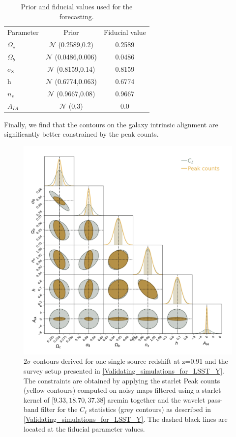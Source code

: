 \documentclass[twocolumn,twocolappendix]{aastex63}
\begin{document}
\begin{table}
	\centering
	\caption{ Prior and fiducial values used for the forecasting.}
	\begin{tabular}{lcc} 
		\hline \hline
		Parameter  & Prior & Fiducial value \\
		$\Omega_c$ & $\mathcal{N}$ (0.2589,0.2) & 0.2589 \\
		$\Omega_b$ & $\mathcal{N}$ (0.0486,0.006) & 0.0486 \\
		$\sigma_8$ & $\mathcal{N}$ (0.8159,0.14) & 0.8159 \\
		h & $\mathcal{N}$ (0.6774,0.063) & 0.6774\\
		$n_s$ & $\mathcal{N}$ (0.9667,0.08) & 0.9667 \\
		$A_{IA}$ &  $\mathcal{N}$ (0,3) &  0.0 \\
		\hline
	\end{tabular}
	\label{tab:prior}
\end{table}
Finally, we find that the contours on the galaxy intrinsic alignment are significantly better constrained by the peak counts. 



 
\begin{figure}
    \centering
    \includegraphics[width=\textwidth]{paper/figures/Fisher_n.pdf}
    \caption{$2\sigma$ contours derived for one single source redshift at z=0.91 and the survey setup presented in \autoref{Validating_simulations_for_LSST_Y}. The constraints are obtained by applying the starlet Peak counts (yellow contours) computed on noisy maps filtered using a starlet kernel of [$9.33, 18.70, 37.38$] arcmin together and the wavelet pass-band filter for the $C_{\ell}$ statistics (grey contours) as described in \autoref{Validating_simulations_for_LSST_Y}.  
The dashed black lines are located at the fiducial parameter values.}
     \label{fig:Fisher_result}
\end{figure}
\end{document}
